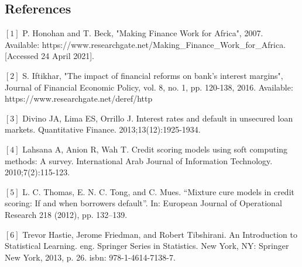 \documentclass[a4paper]{article}
\begin{document}
\vspace{1.2cm}

\begin{enumerate}
\begin{flushleft}

\section*{References}

\begin{flushleft}
\item
    $\left[ 1 \right]$ P. Honohan and T. Beck, "Making Finance Work for Africa", 2007. Available: https://www.researchgate.net/Making_Finance_Work_for_Africa. [Accessed 24 April 2021].
\end{flushleft}
    
\item
    $\left[ 2 \right]$ S. Iftikhar, "The impact of financial reforms on bank’s interest margins", Journal of Financial Economic Policy, vol. 8, no. 1, pp. 120-138, 2016. Available: https://www.researchgate.net/deref/http%
    
\item
    $\left[ 3 \right]$ Divino JA,  Lima  ES, Orrillo  J. Interest  rates and  default in  unsecured loan  markets. Quantitative Finance. 2013;13(12):1925-1934.

\item
    $\left[ 4 \right]$ Lahsana  A,  Anion  R,  Wah  T.  Credit  scoring  models  using  soft  computing  methods:  A  survey. International Arab Journal of Information Technology. 2010;7(2):115-123.
    
\item
    $\left[ 5 \right]$ L. C. Thomas, E. N. C. Tong, and C. Mues. “Mixture cure models in credit scoring: If and when borrowers default”. In: European Journal of Operational Research 218 (2012), pp. 132–139.
    
\item
    $\left[ 6 \right]$ Trevor Hastie, Jerome Friedman, and Robert Tibshirani. An Introduction to Statistical Learning. eng. Springer Series in Statistics. New York, NY: Springer New York, 2013, p. 26. isbn: 978-1-4614-7138-7.


\end{flushleft}
\end{enumerate}
\end{document}
